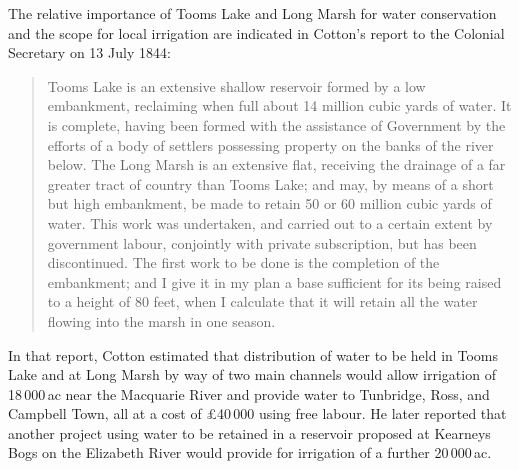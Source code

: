 The relative importance of Tooms Lake and Long Marsh for water
conservation and the scope for local irrigation are indicated in
Cotton's report to the Colonial Secretary on 13 July 1844:
\begin{quote}
	Tooms Lake is an extensive shallow reservoir formed by a low
	embankment, reclaiming when full about 14 million cubic yards
	of water.  It is complete, having been formed with the
	assistance of Government by the efforts of a body of settlers
	possessing property on the banks of the river below.  The Long
	Marsh is an extensive flat, receiving the drainage of a far
	greater tract of country than Tooms Lake; and may, by means of
	a short but high embankment, be made to retain 50 or 60
	million cubic yards of water. This work was undertaken, and
	carried out to a certain extent by government labour,
	conjointly with private subscription, but has been
	discontinued.  The first work to be done is the completion of
	the embankment; and I give it in my plan a base sufficient for
	its being raised to a height of 80 feet, when I calculate that
	it will retain all the water flowing into the marsh in one
	season.
\end{quote}

In that report, Cotton estimated that distribution of water to be held
in Tooms Lake and at Long Marsh by way of two main channels would
allow irrigation of 18\,000\,ac near the Macquarie River and provide
water to Tunbridge, Ross, and Campbell Town, all at a cost of
\pounds40\,000 using free labour.  He later reported that another project
using water to be retained in a reservoir proposed at Kearneys Bogs on
the Elizabeth River would provide for irrigation of a further
20\,000\,ac.

